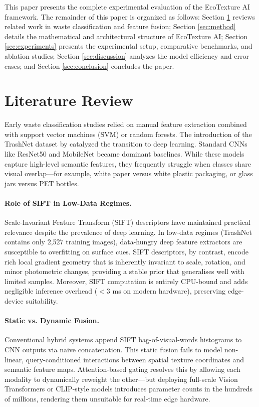\documentclass[12pt, a4paper]{article}
\begin{document}
This paper presents the complete experimental evaluation of the EcoTexture AI framework. The remainder of this paper is organized as follows: Section \ref{sec:lit} reviews related work in waste classification and feature fusion; Section \ref{sec:method} details the mathematical and architectural structure of EcoTexture AI; Section \ref{sec:experiments} presents the experimental setup, comparative benchmarks, and ablation studies; Section \ref{sec:discussion} analyzes the model efficiency and error cases; and Section \ref{sec:conclusion} concludes the paper.

\section{Literature Review}
\label{sec:lit}
Early waste classification studies relied on manual feature extraction combined with support vector machines (SVM) or random forests. The introduction of the TrashNet dataset by \citet{trashnet} catalyzed the transition to deep learning. Standard CNNs like ResNet50 \citep{resnet} and MobileNet \citep{mobilenet} became dominant baselines. While these models capture high-level semantic features, they frequently struggle when classes share visual overlap---for example, white paper versus white plastic packaging, or glass jars versus PET bottles.

\paragraph{Role of SIFT in Low-Data Regimes.}
Scale-Invariant Feature Transform (SIFT) \citep{sift} descriptors have maintained practical relevance despite the prevalence of deep learning. In low-data regimes (TrashNet contains only 2,527 training images), data-hungry deep feature extractors are susceptible to overfitting on surface cues. SIFT descriptors, by contrast, encode rich local gradient geometry that is inherently invariant to scale, rotation, and minor photometric changes, providing a stable prior that generalises well with limited samples. Moreover, SIFT computation is entirely CPU-bound and adds negligible inference overhead (${<}3$ ms on modern hardware), preserving edge-device suitability.

\paragraph{Static vs. Dynamic Fusion.}
Conventional hybrid systems append SIFT bag-of-visual-words histograms to CNN outputs via naive concatenation. This static fusion fails to model non-linear, query-conditioned interactions between spatial texture coordinates and semantic feature maps. Attention-based gating resolves this by allowing each modality to dynamically reweight the other---but deploying full-scale Vision Transformers \citep{vit} or CLIP-style models introduces parameter counts in the hundreds of millions, rendering them unsuitable for real-time edge hardware.
\end{document}
